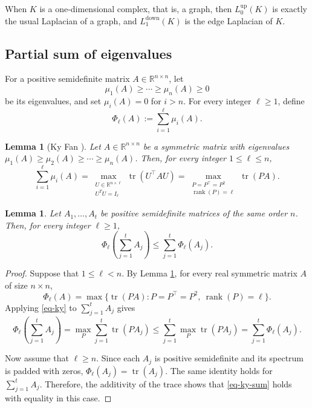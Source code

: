 \documentclass[12pt]{amsart}
\theoremstyle{plain}
\newtheorem{lem}[thm]{Lemma}
\theoremstyle{definition}
\numberwithin{equation}{section}
\numberwithin{figure}{section}
\newcommand{\Ldown}{L^{\operatorname{down}}}
\newcommand{\Lup}{L^{\operatorname{up}}}
\newcommand{\R}{\mathbb R}
\newcommand{\rank}{\operatorname{rank}}
\newcommand{\tr}{\operatorname{tr}}
\begin{document}
When $K$ is a one-dimensional complex, that is, a graph, then $\Lup_{0}(K)$ is exactly the usual Laplacian of a graph,
and $\Ldown_1(K)$ is the edge Laplacian of $K$.

\subsection{Partial sum of eigenvalues}
For a positive semidefinite matrix $A\in\R^{n\times n}$, let
\[
\mu_1(A)\geq\cdots\geq\mu_n(A)\geq 0
\]
be its eigenvalues, and set $\mu_i(A)=0$ for $i>n$.
For every integer $\ell\geq 1$, define
\[
\Phi_\ell(A):=\sum_{i=1}^{\ell}\mu_i(A).
\]

\begin{lem}[Ky Fan \cite{F1949}]\label{ky}
Let $A\in\R^{n\times n}$ be a symmetric matrix with eigenvalues
$\mu_1(A)\geq\mu_2(A)\geq\cdots\geq\mu_n(A)$.
Then, for every integer $1\leq\ell\leq n$,
\[
\sum_{i=1}^{\ell}\mu_i(A)
=
\max_{\substack{U\in\R^{n\times\ell} \\ U^T U=I_\ell}} \tr(U^\top A U)
=
\max_{\substack{P=P^\top=P^2 \\ \rank(P)=\ell}} \tr(P A).
\]
\end{lem}

\begin{lem}\label{ky-sum}
Let $A_1,\ldots,A_t$ be positive semidefinite matrices of the same order $n$.
Then, for every integer $\ell \geq 1$,
\begin{equation}\label{eq-ky-sum}
\Phi_\ell\left(\sum_{j = 1}^t A_j\right)
\leq \sum_{j = 1}^t \Phi_\ell(A_j).
\end{equation}
\end{lem}

\begin{proof}
Suppose that $1 \leq \ell < n$.
By Lemma \ref{ky}, for every real symmetric matrix $A$ of size $n \times n$,
\begin{equation}\label{eq-ky}
\Phi_\ell(A)
= \max\{\tr(PA) : P = P^\top = P^2,\ \rank(P) = \ell\}.
\end{equation}
Applying \eqref{eq-ky} to $\sum_{j = 1}^t A_j$ gives
\[
\Phi_\ell\left(\sum_{j = 1}^t A_j\right)
= \max_P \sum_{j = 1}^t \tr(PA_j)
\leq \sum_{j = 1}^t \max_P \tr(PA_j)
= \sum_{j = 1}^t \Phi_\ell(A_j).
\]

Now assume that $\ell \geq n$.
Since each $A_j$ is positive semidefinite and its spectrum is padded with zeros, $\Phi_\ell(A_j) = \tr(A_j)$.
The same identity holds for $\sum_{j = 1}^t A_j$.
Therefore, the additivity of the trace shows that \eqref{eq-ky-sum} holds with equality in this case.
\end{proof}
\end{document}
